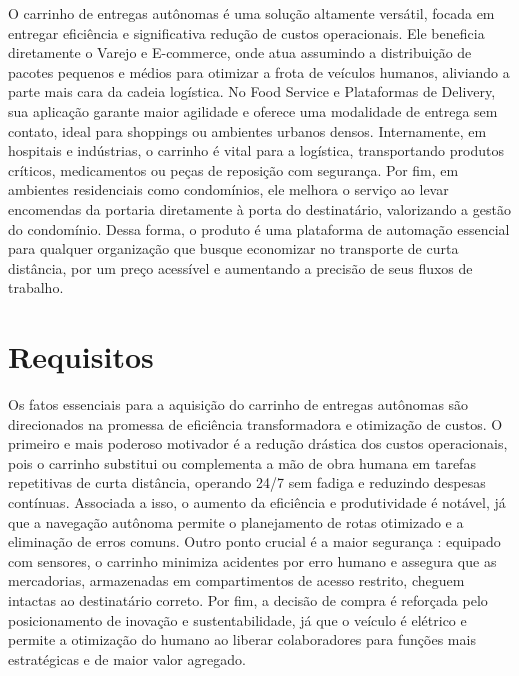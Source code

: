 O carrinho de entregas autônomas é uma solução altamente versátil, focada em entregar eficiência e significativa redução de custos operacionais. Ele beneficia diretamente o Varejo e E-commerce, onde atua assumindo a distribuição de pacotes pequenos e médios para otimizar a frota de veículos humanos, aliviando a parte mais cara da cadeia logística. No Food Service e Plataformas de Delivery, sua aplicação garante maior agilidade e oferece uma modalidade de entrega sem contato, ideal para shoppings ou ambientes urbanos densos. Internamente, em hospitais e indústrias, o carrinho é vital para a logística, transportando produtos críticos, medicamentos ou peças de reposição com segurança. Por fim, em ambientes residenciais como condomínios, ele melhora o serviço ao levar encomendas da portaria diretamente à porta do destinatário, valorizando a gestão do condomínio. Dessa forma, o produto é uma plataforma de automação essencial para qualquer organização que busque economizar no transporte de curta distância, por um preço acessível e aumentando a precisão de seus fluxos de trabalho.


\section{Requisitos}

Os fatos essenciais para a aquisição do carrinho de entregas autônomas são direcionados na promessa de eficiência transformadora e otimização de custos. O primeiro e mais poderoso motivador é a redução drástica dos custos operacionais, pois o carrinho substitui ou complementa a mão de obra humana em tarefas repetitivas de curta distância, operando 24/7 sem fadiga e reduzindo despesas contínuas. Associada a isso, o aumento da eficiência e produtividade é notável, já que a navegação autônoma permite o planejamento de rotas otimizado e a eliminação de erros comuns. Outro ponto crucial é a maior segurança : equipado com sensores, o carrinho minimiza acidentes por erro humano e assegura que as mercadorias, armazenadas em compartimentos de acesso restrito, cheguem intactas ao destinatário correto. Por fim, a decisão de compra é reforçada pelo posicionamento de inovação e sustentabilidade, já que o veículo é elétrico e permite a otimização do humano ao liberar colaboradores para funções mais estratégicas e de maior valor agregado.



